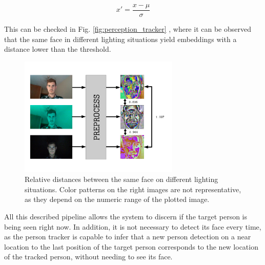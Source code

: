 \begin{equation}
x' = \frac{x - \mu}{\sigma}
\label{eqn:perception_normalization}
\end{equation}

This can be checked in Fig. \ref{fig:perception_tracker} , where it can be observed that the same face in different lighting situations yield embeddings with a distance lower than the threshold.

\begin{figure}[h]
	\centering
	\includegraphics[width=3in]{images/facenet_prewhiten}
	\caption{Relative distances between the same face on different lighting situations. Color patterns on the right images are not representative, as they depend on the numeric range of the plotted image.}
\end{figure}



\vspace{0.4in}

All this described pipeline allows the system to discern if the target person is being seen right now. In addition, it is not necessary to detect its face every time, as the person tracker is capable to infer that a new person detection on a near location to the last position of the target person corresponds to the new location of the tracked person, without needing to see its face.